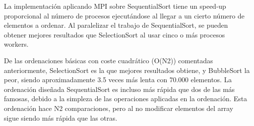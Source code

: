 La implementación aplicando MPI sobre SequentialSort tiene un speed-up proporcional al número de procesos ejecutándose al llegar a un cierto número de elementos a ordenar.  %
Al paralelizar el trabajo de SequentialSort, se pueden obtener mejores resultados que SelectionSort al usar cinco o más procesos workers.

De las ordenaciones básicas con coste cuadrático (O(N2)) comentadas anteriormente, SelectionSort es la que mejores resultados obtiene, y BubbleSort la peor, siendo aproximadamente 3.5 veces más lenta con 70.000 elementos. 
La ordenación diseñada SequentialSort es incluso más rápida que dos de las más famosas, debido a la simpleza de las operaciones aplicadas en la ordenación. Esta ordenación hace N2 comparaciones, pero al no modificar elementos del array sigue siendo más rápida que las otras.


%	
%	

